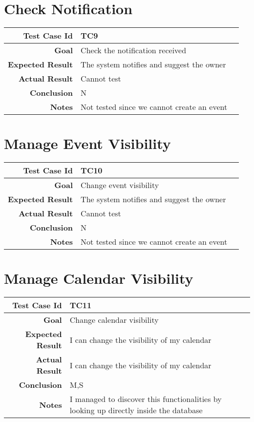 \section{Check Notification}
\begin{tabularx}{\linewidth}{|r|X|X|}
\hline   {\bf Test Case Id} &  TC9\\
  \hline  {\bf Goal} & Check the notification received\\
  
  \hline  {\bf Expected Result} & The system notifies and suggest the owner\\
  \hline  {\bf Actual Result} & Cannot test\\
  \hline  {\bf Conclusion} & N\\
  \hline  {\bf Notes} & Not tested since we cannot create an event\\
  \hline
  
\end{tabularx}
\section{Manage Event Visibility}
\begin{tabularx}{\linewidth}{|r|X|X|}
\hline   {\bf Test Case Id} &  TC10\\
  \hline  {\bf Goal} & Change event visibility\\
  
  \hline  {\bf Expected Result} & The system notifies and suggest the owner\\
  \hline  {\bf Actual Result} & Cannot test\\
  \hline  {\bf Conclusion} & N\\
  \hline  {\bf Notes} & Not tested since we cannot create an event\\
  \hline
  
\end{tabularx}

\section{Manage Calendar Visibility}
\begin{tabularx}{\linewidth}{|r|X|X|}
\hline   {\bf Test Case Id} &  TC11\\
  \hline  {\bf Goal} & Change calendar visibility\\
  
  \hline  {\bf Expected Result} & I can change the visibility of my calendar\\
  \hline  {\bf Actual Result} &  I can change the visibility of my calendar\\
  \hline  {\bf Conclusion} & M,S\\
    \hline  {\bf Notes} & I managed to discover this functionalities by looking up directly inside the database\\
  \hline
  
\end{tabularx}
